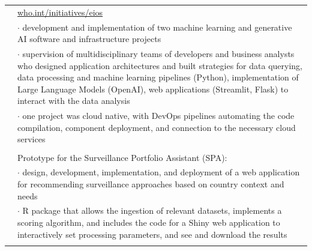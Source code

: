 \documentclass[a4paper,11pt,oneside]{article}
\begin{document}
\begin{longtable}{@{}p{3.1cm}@{}@{}p{13.9cm}@{}}
\begin{tabular}[t]{@{}!{\color{gray}\vrule}p{0.2cm}@{}p{13.3cm}@{}}
      & \href{https://www.who.int/initiatives/eios}{who.int/initiatives/eios} \\
      & $\cdot$ development and implementation of two machine learning and generative AI software and infrastructure projects \\
      & $\cdot$ supervision of multidisciplinary teams of developers and business analysts who designed application architectures and built strategies for data querying, data processing and machine learning pipelines (Python), implementation of Large Language Models (OpenAI), web applications (Streamlit, Flask) to interact with the data analysis \\
      & $\cdot$ one project was cloud native, with DevOps pipelines automating the code compilation, component deployment, and connection to the necessary cloud services \\
      & \\
      & Prototype for the Surveillance Portfolio Assistant (SPA): \\
      & $\cdot$ design, development, implementation, and deployment of a web application for recommending surveillance approaches based on country context and needs \\
      & $\cdot$ R package that allows the ingestion of relevant datasets, implements a scoring algorithm, and includes the code for a Shiny web application to interactively set processing parameters, and see and download the results \\
   \end{tabular} \\
\end{longtable}
\end{document}
